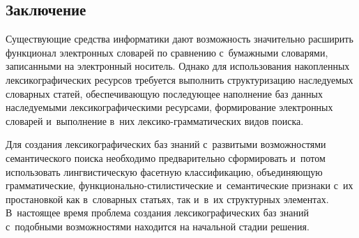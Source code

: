 \begin{multicols}{2}
\vspace*{-6pt}

\section{Заключение}

\vspace*{-3pt}

  Существующие средства информатики дают возможность значительно 
расширить функционал электронных словарей по сравнению с~\mbox{бумажными} 
словарями, записанными на электронный носитель. Однако для 
использования накопленных лексикографических ресурсов требуется 
выполнить структуризацию наследуемых словарных статей, 
обеспечивающую последующее наполнение баз данных наследуемыми 
лексикографическими ресурсами, формирование электронных словарей 
и~выполнение в~них лек\-си\-ко-грам\-ма\-ти\-че\-ских видов поиска.
  
  Для создания лексикографических баз знаний с~развитыми возможностями 
семантического поиска необходимо предварительно сформировать и~потом 
использовать лингвистическую фасетную классификацию, объединяющую 
грамматические, функ\-ци\-о\-наль\-но-сти\-ли\-сти\-че\-ские и~семантические 
признаки с~их простановкой как в~словарных стать\-ях, так и~в~их 
структурных элементах. В~настоящее время проблема создания 
лексикографических баз знаний с~подобными возможностями находится на 
начальной стадии решения.


\vspace*{-6pt}


{\small\frenchspacing
{\baselineskip=10.7pt
\begin{thebibliography}{99}

\vspace*{-2pt}


\end{thebibliography}}}
\end{multicols}
